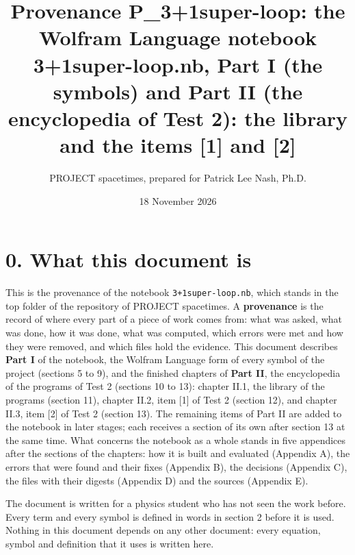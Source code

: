 \documentclass[
  10pt,
]{article}
\title{Provenance P\_3+1super-loop: the Wolfram Language notebook
3+1super-loop.nb, Part I (the symbols) and Part II (the encyclopedia of
Test 2): the library and the items {[}1{]} and {[}2{]}}
\subtitle{PROJECT spacetimes, prepared for Patrick Lee Nash, Ph.D.}
\author{}
\date{18 November 2026}
\begin{document}
\maketitle

\hypertarget{what-this-document-is}{%
\section{0. What this document is}\label{what-this-document-is}}

This is the provenance of the notebook \texttt{3+1super-loop.nb}, which
stands in the top folder of the repository of PROJECT spacetimes. A
\textbf{provenance} is the record of where every part of a piece of work
comes from: what was asked, what was done, how it was done, what was
computed, which errors were met and how they were removed, and which
files hold the evidence. This document describes \textbf{Part I} of the
notebook, the Wolfram Language form of every symbol of the project
(sections 5 to 9), and the finished chapters of \textbf{Part II}, the
encyclopedia of the programs of Test 2 (sections 10 to 13): chapter
II.1, the library of the programs (section 11), chapter II.2, item
{[}1{]} of Test 2 (section 12), and chapter II.3, item {[}2{]} of Test 2
(section 13). The remaining items of Part II are added to the notebook
in later stages; each receives a section of its own after section 13 at
the same time. What concerns the notebook as a whole stands in five
appendices after the sections of the chapters: how it is built and
evaluated (Appendix A), the errors that were found and their fixes
(Appendix B), the decisions (Appendix C), the files with their digests
(Appendix D) and the sources (Appendix E).

The document is written for a physics student who has not seen the work
before. Every term and every symbol is defined in words in section 2
before it is used. Nothing in this document depends on any other
document: every equation, symbol and definition that it uses is written
here.
\end{document}
